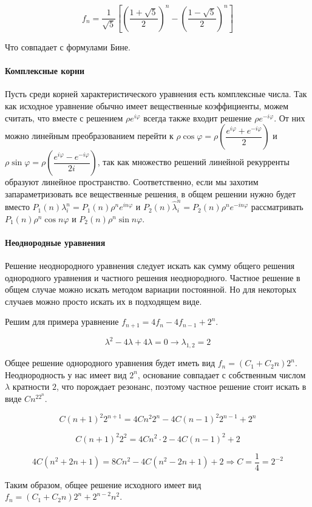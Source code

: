 \documentclass{article}
\begin{document}
$$f_n = \dfrac{1}{\sqrt 5}\left[\left(\dfrac{1+\sqrt 5}{2}\right)^n-\left(\dfrac{1-\sqrt 5}{2}\right)^n\right]$$

Что совпадает с формулами Бине.
\paragraph{Комплексные корни} Пусть среди корней характеристического уравнения есть комплексные числа. Так как исходное уравнение обычно имеет вещественные коэффициенты, можем считать, что вместе с решением $\rho e^{i\varphi}$ всегда также входит решение $\rho e^{-i\varphi}$. От них можно линейным преобразованием перейти к $\rho \cos\varphi = \rho\left(\dfrac{e^{i\varphi}+e^{-i\varphi}}{2}\right)$ и $\rho \sin\varphi = \rho\left(\dfrac{e^{i\varphi}-e^{-i\varphi}}{2i}\right)$, так как множество решений линейной рекурренты образуют линейное пространство. Соответственно, если мы захотим запараметризовать все вещественные решения, в общем решении нужно будет вместо $P_1(n)\lambda_i^n=P_1(n)\rho^n e^{in\varphi}$ и $P_2(n)\hat \lambda_i^n=P_2(n)\rho^ne^{-in\varphi}$ рассматривать $P_1(n) \rho^n \cos n\varphi$ и $P_2(n)\rho^n \sin n\varphi$. 
\paragraph{Неоднородные уравнения} Решение неоднородного уравнения следует искать как сумму общего решения однородного уравнения и частного решения неоднородного. Частное решение в общем случае можно искать методом вариации постоянной. Но для некоторых случаев можно просто искать их в подходящем виде.

Решим для примера уравнение $f_{n+1}=4f_n-4f_{n-1}+2^n$.

$$\lambda^2-4\lambda+4\lambda=0 \to \lambda_{1,2}=2$$

Общее решение однородного уравнения будет иметь вид $f_n = (C_1+C_2n)2^n$. Неоднородность у нас имеет вид $2^n$, основание совпадает с собственным числом $\lambda$ кратности $2$, что порождает резонанс, поэтому частное решение стоит искать в виде $Cn^22^n$.

$$C(n+1)^2 2^{n+1}=4Cn^2 2^n - 4 C (n-1)^2 2^{n-1} + 2^n$$

$$C(n+1)^2 2^2 = 4 Cn^2\cdot 2 - 4 C(n-1)^2+2$$

$$4C(n^2+2n+1)=8Cn^2-4C(n^2-2n+1)+2 \Longrightarrow C = \dfrac 1 4=2^{-2}$$

Таким образом, общее решение исходного имеет вид $f_n = (C_1+C_2n)2^n + 2^{n-2}n^2$.
\end{document}
